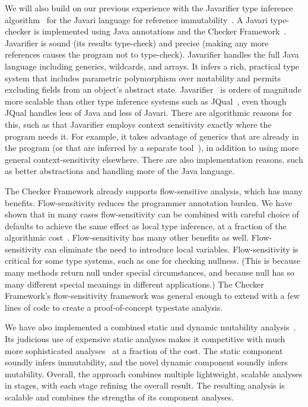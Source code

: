 \documentclass[preprint]{sig-alternate}
\newcommand{\codeid}[1]{\ifmmode{\mbox{\ttfamily{#1}}}\else{\ttfamily #1}\fi}
\begin{document}
We will also build on our previous experience with the Javarifier type
inference algorithm~\cite{Tschantz2006,QuinonezTE2008} for the Javari
language for reference immutability~\cite{BirkaE2004,TschantzE2005}.
A Javari type-checker is implemented using Java annotations and the
Checker Framework~\cite{PapiACPE2008}.  Javarifier is sound (its
results type-check) and precise (making any more references
\codeid{@Readonly} causes the program not to type-check).  Javarifier
handles the full Java language including generics, wildcards, and
arrays.  It infers a rich, practical type system that includes
parametric polymorphism over mutability and permits excluding fields
from an object's abstract state.  Javarifier~\cite{Tschantz2006} is
orders of magnitude more scalable than other type inference systems
such as JQual~\cite{GreenfieldboyceF2007}, even though JQual handles
less of Java and less of Javari.  There are algorithmic reasons for
this, such as that Javarifier employs context sensitivity exactly
where the program needs it.  For example, it takes advantage of
generics that are already in the program (or that are inferred by a
separate tool~\cite{DonovanKTE2004,KiezunETF2007}), in addition to
using more general context-sensitivity elsewhere.  There are also
implementation reasons, such as better abstractions and handling more
of the Java language.

The Checker Framework already supports flow-sensitive analysis, which has
many benefits.
%
Flow-sensitivity reduces the programmer annotation burden.  We have shown
that in many cases flow-sensitivity can be combined with careful choice of
defaults to achieve the same effect as local type inference, at a fraction
of the algorithmic cost~\cite{PapiACPE2008}.
%
Flow-sensitivity has many other benefits as well.
%
Flow-sensitivity can eliminate the need to introduce local variables.
%
Flow-sensitivity
is critical for some type systems, such as one for checking nullness.
(This is because many methods return null under special circumstances, and
because null has so many different special meanings in different
applications.)
%
The Checker Framework's flow-sensitivity framework was general enough to
extend with a few lines of code to create a proof-of-concept typestate
analysis.

We have also implemented a combined static and dynamic mutability
analysis~\cite{ArtziKGE2007}.  Its judicious use of expensive static
analyses makes it competitive with much more sophisticated
analyses~\cite{SalcianuR2005} at a fraction of the cost.  The static
component soundly infers immutability, and the novel dynamic component
soundly infers mutability.  Overall, the approach combines multiple
lightweight, scalable analyses in stages, with each stage refining the
overall result.  The resulting analysis is scalable and combines the
strengths of its component analyses.
\end{document}
